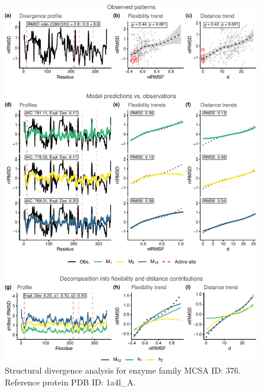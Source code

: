 \documentclass[
]{article}
\begin{document}
\clearpage
\begin{figure}[H]
\centering


\begin{center}\includegraphics{supplementary_material_files/figure-latex/generate_figures-19} \end{center}

\caption{Structural divergence analysis for enzyme family MCSA ID: 376. Reference protein PDB ID: 1a4l\_A.}
\end{figure}
\end{document}
